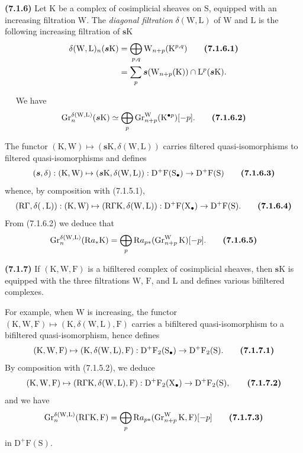 \documentclass[11pt,leqno]{article}
\newcommand{\Page}[1]{\ifvmode\noindent\else\unskip\ \fi{\footnotesize\textcolor{gray}{[p.\,#1]}}\ \ignorespaces}
\begin{document}
\textbf{(7.1.6)} Let \(\mathrm{K}\) be a complex of cosimplicial sheaves on \(\mathrm{S}\), equipped with an increasing filtration \(\mathrm{W}\). The \textit{diagonal filtration} \(\delta(\mathrm{W},\mathrm{L})\) of \(\mathrm{W}\) and \(\mathrm{L}\) is the following increasing filtration of \(\boldsymbol{s}\mathrm{K}\)
\begin{align*}
\delta(\mathrm{W},\mathrm{L})_n(\boldsymbol{s}\mathrm{K})
&=\bigoplus_{p,q}\mathrm{W}_{n+p}(\mathrm{K}^{p,q})
\tag*{\textbf{(7.1.6.1)}}\\
&=\sum_p\boldsymbol{s}(\mathrm{W}_{n+p}(\mathrm{K}))
\cap\mathrm{L}^{p}(\boldsymbol{s}\mathrm{K}).
\end{align*}

\Page{25}
We have
\[
\operatorname{Gr}_{n}^{\delta(\mathrm{W},\mathrm{L})}
(\boldsymbol{s}\mathrm{K})
\simeq
\bigoplus_p\operatorname{Gr}_{n+p}^{\mathrm{W}}
(\mathrm{K}^{\bullet p})[-p].
\tag*{\textbf{(7.1.6.2)}}
\]

The functor \((\mathrm{K},\mathrm{W})\mapsto
(\boldsymbol{s}\mathrm{K},\delta(\mathrm{W},\mathrm{L}))\) carries filtered quasi-isomorphisms to filtered quasi-isomorphisms and defines
\[
(\boldsymbol{s},\delta):
(\mathrm{K},\mathrm{W})\mapsto
(\boldsymbol{s}\mathrm{K},\delta(\mathrm{W},\mathrm{L})):
\mathrm{D}^{+}\mathrm{F}(\mathrm{S}_{\bullet})
\to\mathrm{D}^{+}\mathrm{F}(\mathrm{S})
\tag*{\textbf{(7.1.6.3)}}
\]
whence, by composition with (7.1.5.1),
\[
(\mathrm{R}\Gamma,\delta(\, ,\mathrm{L})):
(\mathrm{K},\mathrm{W})\mapsto
(\mathrm{R}\Gamma\mathrm{K},\delta(\mathrm{W},\mathrm{L})):
\mathrm{D}^{+}\mathrm{F}(\mathrm{X}_{\bullet})
\to\mathrm{D}^{+}\mathrm{F}(\mathrm{S}).
\tag*{\textbf{(7.1.6.4)}}
\]
From (7.1.6.2) we deduce that
\[
\operatorname{Gr}_{n}^{\delta(\mathrm{W},\mathrm{L})}
(\mathrm{R}a_{\ast}\mathrm{K})
=\bigoplus_p\mathrm{R}a_{p\ast}
(\operatorname{Gr}_{n+p}^{\mathrm{W}}\mathrm{K})[-p].
\tag*{\textbf{(7.1.6.5)}}
\]

\textbf{(7.1.7)} If \((\mathrm{K},\mathrm{W},\mathrm{F})\) is a bifiltered complex of cosimplicial sheaves, then \(\boldsymbol{s}\mathrm{K}\) is equipped with the three filtrations \(\mathrm{W}\), \(\mathrm{F}\), and \(\mathrm{L}\) and defines various bifiltered complexes.

For example, when \(\mathrm{W}\) is increasing, the functor \((\mathrm{K},\mathrm{W},\mathrm{F})\mapsto
(\mathrm{K},\delta(\mathrm{W},\mathrm{L}),\mathrm{F})\) carries a bifiltered quasi-isomorphism to a bifiltered quasi-isomorphism, hence defines
\[
(\mathrm{K},\mathrm{W},\mathrm{F})\mapsto
(\mathrm{K},\delta(\mathrm{W},\mathrm{L}),\mathrm{F}):
\mathrm{D}^{+}\mathrm{F}_2(\mathrm{S}_{\bullet})
\to\mathrm{D}^{+}\mathrm{F}_2(\mathrm{S}).
\tag*{\textbf{(7.1.7.1)}}
\]
By composition with (7.1.5.2), we deduce
\[
(\mathrm{K},\mathrm{W},\mathrm{F})\mapsto
(\mathrm{R}\Gamma\mathrm{K},\delta(\mathrm{W},\mathrm{L}),\mathrm{F}):
\mathrm{D}^{+}\mathrm{F}_2(\mathrm{X}_{\bullet})
\to\mathrm{D}^{+}\mathrm{F}_2(\mathrm{S}),
\tag*{\textbf{(7.1.7.2)}}
\]
and we have
\[
\operatorname{Gr}_{n}^{\delta(\mathrm{W},\mathrm{L})}
(\mathrm{R}\Gamma\mathrm{K},\mathrm{F})
=\bigoplus_p\mathrm{R}a_{p\ast}
(\operatorname{Gr}_{n+p}^{\mathrm{W}}\mathrm{K},\mathrm{F})[-p]
\tag*{\textbf{(7.1.7.3)}}
\]
in \(\mathrm{D}^{+}\mathrm{F}(\mathrm{S})\).
\end{document}
